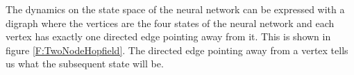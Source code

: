 %

   The dynamics on the state space of the neural network can be expressed with 
a digraph where the vertices are the four states of the neural network and each
vertex has exactly one directed edge pointing away from it.  This is shown in
figure \ref{F:TwoNodeHopfield}.  The directed edge pointing away from a vertex 
tells us what the subsequent state will be.

